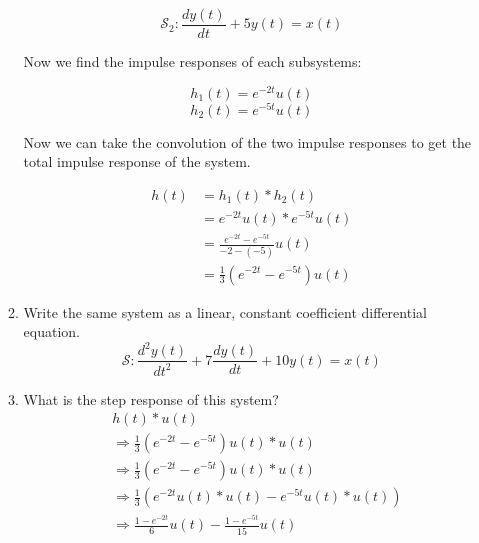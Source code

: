 \documentclass{article}
\begin{document}
\begin{enumerate}
\begin{enumerate}
\begin{equation}
        \end{equation}
        \begin{equation}
            \mathcal{S}_2: \frac{dy(t)}{dt} + 5y(t) = x(t)
        \end{equation}
        \begin{center}
            Now we find the impulse responses of each subsystems:
        \end{center}
        \begin{equation}
            h_1(t) = e^{-2t}u(t)
        \end{equation}
        \begin{equation}
            h_2(t) = e^{-5t}u(t)
        \end{equation}
        \begin{center}
            Now we can take the convolution of the two impulse responses to get the total impulse response of the system.
        \end{center}
        \begin{align}
            h(t) &=  h_1(t) * h_2(t)\\
            &=  e^{-2t}u(t) * e^{-5t}u(t)\\
            &=  \frac{e^{-2t}-e^{-5t}}{-2 - (-5)}u(t)\\
            &=  \boxed{\frac{1}{3}(e^{-2t}-e^{-5t})u(t)}
        \end{align}
        \item Write the same system as a linear, constant coefficient differential equation.
        \begin{equation}
            \boxed{\mathcal{S}: \frac{d^2y(t)}{dt^2} + 7\frac{dy(t)}{dt}+ 10y(t) =  x(t)}
        \end{equation}
        \item What is the step response of this system?
        \begin{align}
            &h(t) * u(t)\\
            &\Rightarrow \frac{1}{3}(e^{-2t}-e^{-5t})u(t) * u(t)\\
            &\Rightarrow \frac{1}{3}(e^{-2t}-e^{-5t})u(t) * u(t)\\
            &\Rightarrow \frac{1}{3}(e^{-2t}u(t)* u(t)-e^{-5t}u(t)*u(t)) \\
            &\Rightarrow \boxed{\frac{1-e^{-2t}}{6}u(t)-\frac{1-e^{-5t}}{15}u(t)}
        \end{align}
    \end{enumerate}
    \newpage
    \begin{center}

\end{center}
\end{enumerate}
\end{document}

